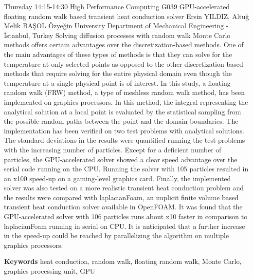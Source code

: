 
    \begin{abstract_basarim}
    {Thursday 14:15-14:30}
    {High Performance Computing}
    {G039}
    {GPU-accelerated floating random walk based transient heat conduction solver}
    {%
    Ersin YILDIZ, Altuğ Melik BAŞOL}
    {%
    }
    {%
    Özyeğin University Department of Mechanical Engineering - İstanbul, Turkey}
    Solving diffusion processes with random walk Monte Carlo methods offers certain advantages over the discretization-based methods. One of the main advantages of these types of methods is that they can solve for the temperature at only selected points as opposed to the other discretization-based methods that require solving for the entire physical domain even though the temperature at a single physical point is of interest. In this study, a floating random walk (FRW) method, a type of meshless random walk method, has been implemented on graphics processors. In this method, the integral representing the analytical solution at a local point is evaluated by the statistical sampling from the possible random paths between the point and the domain boundaries. The implementation has been verified on two test problems with analytical solutions. The standard deviations in the results were quantified running the test problems with the increasing number of particles. Except for a deficient number of particles, the GPU-accelerated solver showed a clear speed advantage over the serial code running on the CPU. Running the solver with 105 particles resulted in an x100 speed-up on a gaming-level graphics card. Finally, the implemented solver was also tested on a more realistic transient heat conduction problem and the results were compared with laplacianFoam, an implicit finite volume based transient heat conduction solver available in OpenFOAM. It was found that the GPU-accelerated solver with 106 particles runs about x10 faster in comparison to laplacianFoam running in serial on CPU. It is anticipated that a further increase in the speed-up could be reached by parallelizing the algorithm on multiple graphics processors. 
    
        \textbf{Keywords} \newline{}heat conduction, random walk, floating random walk, Monte Carlo, graphics processing unit, GPU
    \end{abstract_basarim}
    